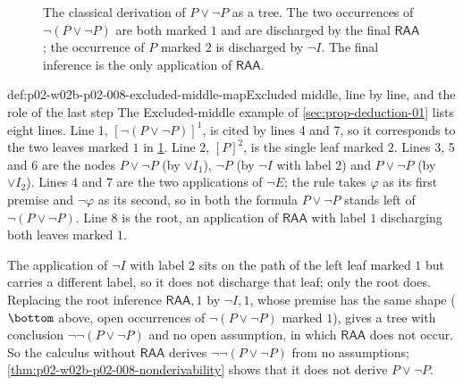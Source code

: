 \begin{figure}[htbp]
\centering
{}
\caption{The classical derivation of \(P\lor\neg P\) as a tree.  The two
occurrences of \(\neg(P\lor\neg P)\) are both marked \(1\) and are
discharged by the final \(\mathsf{RAA}\); the occurrence of \(P\) marked
\(2\) is discharged by \(\neg I\).  The final inference is the only
application of \(\mathsf{RAA}\).}
\label{fig:p02-w02b-p02-008-excluded-middle-tree}
\end{figure}

\begin{hbexample}{def:p02-w02b-p02-008-excluded-middle-map}{Excluded middle, line by line, and the role of the last step}
The Excluded-middle example of \cref{sec:prop-deduction-01} lists eight
lines.  Line 1, \([\neg(P\lor\neg P)]^1\), is cited by lines 4 and 7, so it
corresponds to the two leaves marked \(1\) in
\cref{fig:p02-w02b-p02-008-excluded-middle-tree}.  Line 2, \([P]^2\), is the
single leaf marked \(2\).  Lines 3, 5 and 6 are the nodes \(P\lor\neg P\)
(by \(\lor I_1\)), \(\neg P\) (by \(\neg I\) with label \(2\)) and
\(P\lor\neg P\) (by \(\lor I_2\)).  Lines 4 and 7 are the two applications of
\(\neg E\); the rule takes \(\varphi\) as its first premise and
\(\neg\varphi\) as its second, so in both the formula \(P\lor\neg P\) stands
left of \(\neg(P\lor\neg P)\).  Line 8 is the root, an application of
\(\mathsf{RAA}\) with label \(1\) discharging both leaves marked \(1\).

The application of \(\neg I\) with label \(2\) sits on the path of the left
leaf marked \(1\) but carries a different label, so it does not discharge
that leaf; only the root does.  Replacing the root inference
\(\mathsf{RAA},1\) by \(\neg I,1\), whose premise has the same shape
(\(\bottom\) above, open occurrences of \(\neg(P\lor\neg P)\) marked \(1\)),
gives a tree with conclusion \(\neg\neg(P\lor\neg P)\) and no open
assumption, in which \(\mathsf{RAA}\) does not occur.  So the calculus
without \(\mathsf{RAA}\) derives \(\neg\neg(P\lor\neg P)\) from no
assumptions; \cref{thm:p02-w02b-p02-008-nonderivability} shows that it
does not derive \(P\lor\neg P\).
\end{hbexample}

